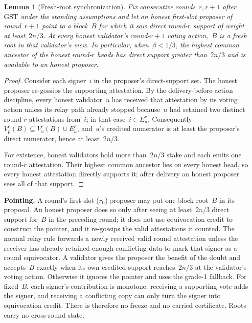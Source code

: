 \ifx\litemode\undefined\documentclass{article}\fi
\newcommand{\GST}{\ensuremath{\mathrm{GST}}\xspace}
\newcommand{\rzero}{\ensuremath{r_{0}}}                 %
\renewcommand{\paragraph}[1]{\vspace{7pt}\noindent\textbf{#1}}
\theoremstyle{plain}
\newtheorem{lemma}{Lemma}
\theoremstyle{definition}
\theoremstyle{remark}
\begin{document}
\begin{lemma}[Fresh-root synchronization]\label{lem:honest-fresh-quorum}
Fix consecutive rounds~$r,r+1$ after \GST{} under the standing assumptions and
let an honest first-slot proposer of round~$r+1$ point to a block~$B$ for which
it saw direct round-$r$ support of weight at least~$2n/3$.  At every honest
validator's round-$r+1$ voting action,~$B$ is a fresh root in that validator's
view.  In particular, when~$\beta<1/3$, the highest common ancestor of the
honest round-$r$ heads has direct support greater than~$2n/3$ and is available
to an honest proposer.
\end{lemma}

\begin{proof}
Consider each signer~$i$ in the proposer's direct-support set.  The honest
proposer re-gossips the supporting attestation.  By the delivery-before-action
discipline, every honest validator~$u$ has received that attestation by its
voting action unless its relay path already stopped because~$u$ had retained
two distinct round-$r$ attestations from~$i$; in that case~$i\in E_u^r$.
Consequently
\(V_p^r(B)\subseteq V_u^r(B)\cup E_u^r\), and~$u$'s credited numerator is at
least the proposer's direct numerator, hence at least~$2n/3$.

For existence, honest validators hold more than~$2n/3$ stake and each emits
one round-$r$ attestation.  Their highest common ancestor lies on every honest
head, so every honest attestation directly supports it; after delivery an
honest proposer sees all of that support.
\end{proof}

\paragraph{Pointing.}
A round's first-slot ($\rzero$) proposer may put one block root~$B$ in its
proposal.  An honest proposer does so only after seeing at least~$2n/3$ direct
support for~$B$ in the preceding round; it does not use equivocation credit to
construct the pointer, and it re-gossips the valid attestations it counted.
The normal relay rule forwards a newly received valid round attestation unless
the receiver has already retained enough conflicting data to mark that signer
as a round equivocator.  A validator gives the proposer the benefit of the
doubt and accepts~$B$ exactly when its own credited support reaches~$2n/3$ at
the validator's voting action.  Otherwise it ignores the pointer and uses the
grade-1 fallback.  For fixed~$B$, each signer's contribution is monotone:
receiving a supporting vote adds the signer, and receiving a conflicting copy
can only turn the signer into equivocation credit.  There is therefore no
freeze and no carried certificate.  Roots carry no cross-round state.
\end{document}
